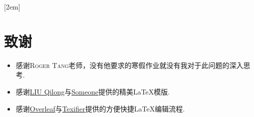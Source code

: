 
[2em]{\vspace{.5\baselineskip}\xiaosan\song}
             {\prechaptername\CJKnumber{\thecontentslabel}\postchaptername\qquad}{} 
             {}                            %
\lhead{}
\rhead{}
\lfoot{}
\cfoot{}
\rfoot{}
\chapter*{致\quad 谢}
\setcounter{page}{1}

\begin{itemize}
	\item 感谢\textsc{Roger Tang}老师，没有他要求的寒假作业就没有我对于此问题的深入思考.
	\item 感谢\href{https://www.overleaf.com/latex/templates/xi-nan-da-xue-swu-beamer-zhu-ti/bgprxfbyhqsb}{LIU Qilong}与\href{https://www.overleaf.com/latex/templates/tian-jin-da-xue-tianjin-university-tju-2022ben-ke-sheng-bi-ye-lun-wen/rrfbkrpsrdkh}{Someone}提供的精美\LaTeX 模版.
	\item 感谢\href{https://www.overleaf.com/}{Overleaf}与\href{https://www.texifier.com/}{Texifier}提供的方便快捷\LaTeX 编辑流程.
\end{itemize}
